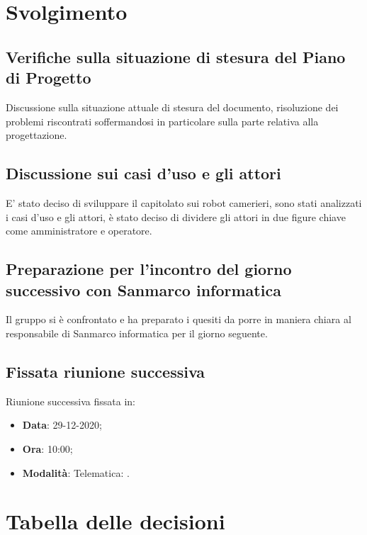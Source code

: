 \documentclass[]{article}
\begin{document}
	\newpage

	\section{Svolgimento}
		\subsection{Verifiche sulla situazione di stesura del Piano di Progetto}
		Discussione sulla situazione attuale di stesura del documento, risoluzione dei problemi riscontrati soffermandosi in particolare sulla parte relativa alla progettazione.\\

		\subsection{Discussione sui casi d'uso e gli attori }
		E' stato deciso di sviluppare il capitolato sui robot camerieri, sono stati analizzati i casi d'uso e gli attori, è stato deciso di dividere gli attori in due figure chiave come amministratore e operatore.\\
		
		\subsection{Preparazione per l'incontro del giorno successivo con Sanmarco informatica}
		Il gruppo si è confrontato e ha preparato i quesiti da porre in maniera chiara al responsabile di Sanmarco informatica per il giorno seguente.\\

		\subsection{Fissata riunione successiva}
		Riunione successiva fissata in:
		\begin{itemize}
			\item \textbf{Data}: 29-12-2020;
			\item \textbf{Ora}: 10:00;
			\item \textbf{Modalità}: Telematica: .
		\end{itemize}
	
	\newpage
	
	\section{Tabella delle decisioni}
	
\end{document}
